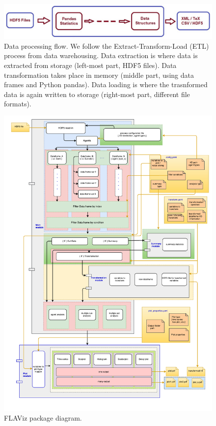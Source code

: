 \documentclass[10pt,a4paper]{article}
\begin{document}
\begin{figure}
\centering\leavevmode
\graphicspath{{./png/}}
%
\begin{boxedminipage}{14cm}
\centering\leavevmode
\includegraphics[scale=.5]{data_processing.pdf} 
\end{boxedminipage}
\label{Fig: Data processing}
\caption{\footnotesize Data processing flow. We follow the Extract-Transform-Load (ETL) process from data warehousing. Data extraction is where data is extracted from storage (left-most part, HDF5 files). Data transformation takes place in memory (middle part, using data frames and Python pandas). Data loading is where the trasnformed data is again written to storage (right-most part, different file formats).}
\end{figure}


\begin{figure}[Htp!]
\centering\leavevmode
\graphicspath{{./png/}}
%
\begin{boxedminipage}{16cm}
\centering\leavevmode
\includegraphics[scale=.4]{flavis_package_diagram.pdf} 
\end{boxedminipage}
\label{Fig: Package diagram}
\caption{\footnotesize FLAViz package diagram.}
\end{figure}
\end{document}
